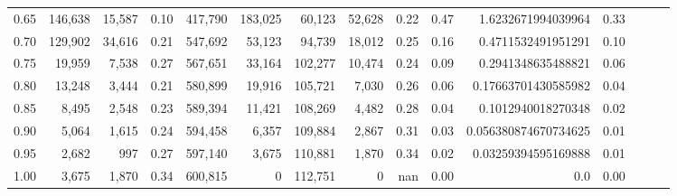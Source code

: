\begin{tabular}{rrrrrrrrrrrrrrr}
0.65 &  146,638 &  15,587 &  0.10 &  417,790 &  183,025 &   60,123 &   52,628 &  0.22 &  0.47 &    1.6232671994039964 &      0.33 \\
0.70 &  129,902 &  34,616 &  0.21 &  547,692 &   53,123 &   94,739 &   18,012 &  0.25 &  0.16 &    0.4711532491951291 &      0.10 \\
0.75 &   19,959 &   7,538 &  0.27 &  567,651 &   33,164 &  102,277 &   10,474 &  0.24 &  0.09 &    0.2941348635488821 &      0.06 \\
0.80 &   13,248 &   3,444 &  0.21 &  580,899 &   19,916 &  105,721 &    7,030 &  0.26 &  0.06 &   0.17663701430585982 &      0.04 \\
0.85 &    8,495 &   2,548 &  0.23 &  589,394 &   11,421 &  108,269 &    4,482 &  0.28 &  0.04 &    0.1012940018270348 &      0.02 \\
0.90 &    5,064 &   1,615 &  0.24 &  594,458 &    6,357 &  109,884 &    2,867 &  0.31 &  0.03 &  0.056380874670734625 &      0.01 \\
0.95 &    2,682 &     997 &  0.27 &  597,140 &    3,675 &  110,881 &    1,870 &  0.34 &  0.02 &   0.03259394595169888 &      0.01 \\
1.00 &    3,675 &   1,870 &  0.34 &  600,815 &        0 &  112,751 &        0 &   nan &  0.00 &                   0.0 &      0.00 \\
\bottomrule
\end{tabular}
